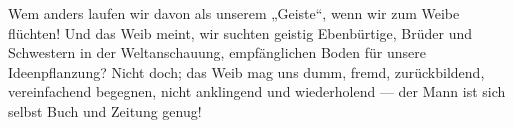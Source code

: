 Wem anders laufen wir davon als unserem „Geiste“, wenn wir zum Weibe flüchten! Und das Weib meint, wir suchten geistig Ebenbürtige, Brüder und Schwestern in der Weltanschauung, empfänglichen Boden für unsere Ideenpflanzung? Nicht doch; das Weib mag uns dumm, fremd, zurückbildend, vereinfachend begegnen, nicht anklingend und wiederholend — der Mann ist sich selbst Buch und Zeitung genug!
\par

